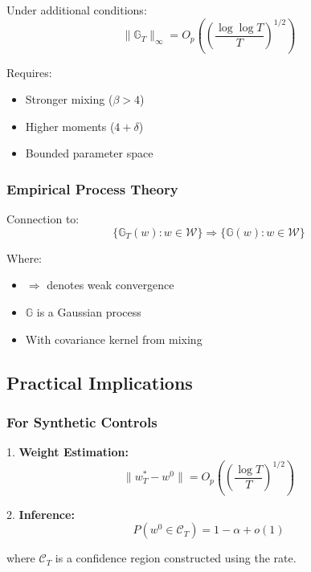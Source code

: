 \documentclass[12pt,article]{memoir}
\begin{document}
Under additional conditions:
\begin{equation}
    \|\mathbb{G}_T\|_{\infty} = O_p\left(\left(\frac{\log\log T}{T}\right)^{1/2}\right)
\end{equation}

Requires:
\begin{itemize}
    \item Stronger mixing ($\beta > 4$)
    \item Higher moments ($4 + \delta$)
    \item Bounded parameter space
\end{itemize}

\subsubsection{Empirical Process Theory}

Connection to:
\begin{equation}
    \{\mathbb{G}_T(w): w \in \mathcal{W}\} \Rightarrow \{\mathbb{G}(w): w \in \mathcal{W}\}
\end{equation}

Where:
\begin{itemize}
    \item $\Rightarrow$ denotes weak convergence
    \item $\mathbb{G}$ is a Gaussian process
    \item With covariance kernel from mixing
\end{itemize}

\subsection{Practical Implications}

\subsubsection{For Synthetic Controls}

1. \textbf{Weight Estimation:}
\begin{equation}
    \|w_T^* - w^0\| = O_p\left(\left(\frac{\log T}{T}\right)^{1/2}\right)
\end{equation}

2. \textbf{Inference:}
\begin{equation}
    P(w^0 \in \mathcal{C}_T) = 1 - \alpha + o(1)
\end{equation}

where $\mathcal{C}_T$ is a confidence region constructed using the rate.
\end{document}
